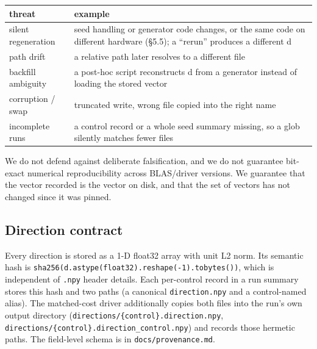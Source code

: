 \documentclass[
  10pt,
]{article}
\newcounter{none} %
\begin{document}
{\def\LTcaptype{none} %
\begin{longtable}[]{@{}
  >{\raggedright\arraybackslash}p{}
  >{\raggedright\arraybackslash}p{}@{}}
\toprule\noalign{}
\begin{minipage}[b]{\linewidth}\raggedright
threat
\end{minipage} & \begin{minipage}[b]{\linewidth}\raggedright
example
\end{minipage} \\
\midrule\noalign{}
\endhead
\bottomrule\noalign{}
\endlastfoot
silent regeneration & seed handling or generator code changes, or the
same code on different hardware (§5.5); a ``rerun'' produces a different
d \\
path drift & a relative path later resolves to a different file \\
backfill ambiguity & a post-hoc script reconstructs d from a generator
instead of loading the stored vector \\
corruption / swap & truncated write, wrong file copied into the right
name \\
incomplete runs & a control record or a whole seed summary missing, so a
glob silently matches fewer files \\
\end{longtable}
}

We do not defend against deliberate falsification, and we do not
guarantee bit-exact numerical reproducibility across BLAS/driver
versions. We guarantee that the vector recorded is the vector on disk,
and that the set of vectors has not changed since it was pinned.

\subsection{Direction contract}\label{direction-contract}

Every direction is stored as a 1-D float32 array with unit L2 norm. Its
semantic hash is
\texttt{sha256(d.\allowbreak astype(float32).\allowbreak reshape(-1).\allowbreak tobytes())}, which is
independent of \texttt{.npy} header details. Each per-control record in
a run summary stores this hash and two paths (a canonical
\texttt{direction.npy} and a control-named alias). The matched-cost
driver additionally copies both files into the run's own output
directory (\texttt{directions/\{control\}.direction.npy},
\texttt{directions/\{control\}.direction\_control.npy}) and records
those hermetic paths. The field-level schema is in
\texttt{docs/provenance.md}.
\end{document}
